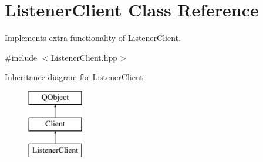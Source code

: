 \hypertarget{class_listener_client}{}\section{Listener\+Client Class Reference}
\label{class_listener_client}


Implements extra functionality of \hyperlink{class_listener_client}{Listener\+Client}.  




{\ttfamily \#include $<$Listener\+Client.\+hpp$>$}

Inheritance diagram for Listener\+Client\+:\begin{figure}[H]
\begin{center}
\leavevmode
\includegraphics[height=3.000000cm]{class_listener_client}
\end{center}
\end{figure}
